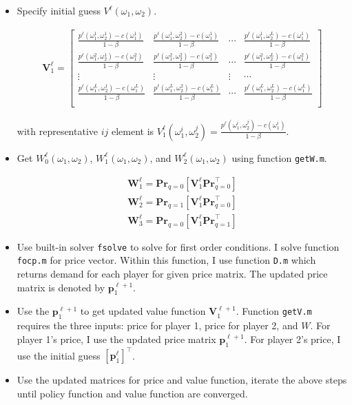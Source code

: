 \documentclass[11pt,letter]{article}
\newcommand{\vect}[1]{\boldsymbol{\mathbf{#1}}}
\newcounter{lem}[section] \setcounter{lem}{0}
\newcommand{\lprn}[1]{\left[{#1}\right]}
\newcommand{\bmat}[1]{\begin{bmatrix} #1 \end{bmatrix}}%
\newcommand{\code}[1]{\texttt{#1}}
\begin{document}
\begin{itemize}
\item Specify initial guess $V^\ell(\omega_1,\omega_2)$. 

\begin{align*}
\vect{V}_1^\ell = \bmat{\frac{p^\ell(\omega_1^1,\omega_2^1)-c(\omega_1^1)}{1-\beta} & \frac{p^\ell(\omega_1^1,\omega_2^2)-c(\omega_1^1)}{1-\beta} & \cdots & \frac{p^\ell(\omega_1^1,\omega_2^L)-c(\omega_1^1)}{1-\beta}\\
						\frac{p^\ell(\omega_1^2,\omega_2^1)-c(\omega_1^2)}{1-\beta} & \frac{p^\ell(\omega_1^2,\omega_2^2)-c(\omega_1^2)}{1-\beta} & \cdots & \frac{p^\ell(\omega_1^2,\omega_2^L)-c(\omega_1^2)}{1-\beta}\\
						\vdots & \vdots & \vdots & \cdots \\
						\frac{p^\ell(\omega_1^L,\omega_2^1)-c(\omega_1^L)}{1-\beta} & \frac{p^\ell(\omega_1^L,\omega_2^2)-c(\omega_1^L)}{1-\beta} & \cdots & \frac{p^\ell(\omega_1^L,\omega_2^L)-c(\omega_1^L)}{1-\beta}\\}			
\end{align*}

with representative $ij$ element is $V_1^\ell(\omega_1^i,\omega_2^j) = \frac{p^\ell(\omega_1^i,\omega_2^j)-c(\omega_1^i)}{1-\beta}$.

\item Get $W_0^\ell(\omega_1,\omega_2)$, $W_1^\ell(\omega_1,\omega_2)$, and $W_2^\ell(\omega_1,\omega_2)$ using function \code{getW.m}. 

\begin{align*}
\vect{W}_1^\ell =\vect{Pr}_{q=0}\lprn{\vect{V}_1^\ell\vect{Pr}_{q=0}^\top}\\
\vect{W}_2^\ell =\vect{Pr}_{q=1}\lprn{\vect{V}_1^\ell\vect{Pr}_{q=0}^\top}\\
\vect{W}_3^\ell =\vect{Pr}_{q=0}\lprn{\vect{V}_1^\ell\vect{Pr}_{q=1}^\top}
\end{align*}

\item Use built-in solver \code{fsolve} to solve for first order conditions. I solve function \code{focp.m} for price vector. Within this function, I use function \code{D.m} which returns demand for each player for given price matrix. The updated price matrix is denoted by $\vect{p}_1^{\ell+1}$.

\item Use the $\vect{p}_1^{\ell+1}$ to get updated value function $\vect{V}_1^{\ell+1}$. Function \code{getV.m} requires the three inputs: price for player 1, price for player 2, and $W$. For player 1's price, I use the updated price matrix $\vect{p}_1^{\ell+1}$. For player 2's price, I use the initial guess $\lprn{\vect{p}_1^{\ell}}^\top$.

\item Use the updated matrices for price and value function, iterate the above steps until policy function and value function are converged. 

\end{itemize}
\end{document}
